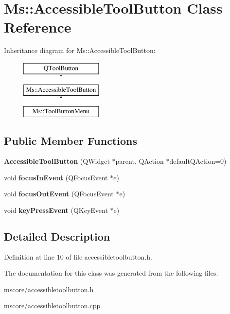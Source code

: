 \hypertarget{class_ms_1_1_accessible_tool_button}{}\section{Ms\+:\+:Accessible\+Tool\+Button Class Reference}
\label{class_ms_1_1_accessible_tool_button}
Inheritance diagram for Ms\+:\+:Accessible\+Tool\+Button\+:\begin{figure}[H]
\begin{center}
\leavevmode
\includegraphics[height=3.000000cm]{class_ms_1_1_accessible_tool_button}
\end{center}
\end{figure}
\subsection*{Public Member Functions}
\begin{DoxyCompactItemize}
\item 
\mbox{\label{class_ms_1_1_accessible_tool_button_ace1fb58a6badc5a3defe34ddb1afd970}} 
{\bfseries Accessible\+Tool\+Button} (Q\+Widget $\ast$parent, Q\+Action $\ast$default\+Q\+Action=0)
\item 
\mbox{\label{class_ms_1_1_accessible_tool_button_acd2b1c088299ee0a40c0dd819ffb1a96}} 
void {\bfseries focus\+In\+Event} (Q\+Focus\+Event $\ast$e)
\item 
\mbox{\label{class_ms_1_1_accessible_tool_button_abdcbc7c5510b2455eaa8ebe5b05ff159}} 
void {\bfseries focus\+Out\+Event} (Q\+Focus\+Event $\ast$e)
\item 
\mbox{\label{class_ms_1_1_accessible_tool_button_afd5d22b0184a32bd770e3180a68166b2}} 
void {\bfseries key\+Press\+Event} (Q\+Key\+Event $\ast$e)
\end{DoxyCompactItemize}


\subsection{Detailed Description}


Definition at line 10 of file accessibletoolbutton.\+h.



The documentation for this class was generated from the following files\+:\begin{DoxyCompactItemize}
\item 
mscore/accessibletoolbutton.\+h\item 
mscore/accessibletoolbutton.\+cpp\end{DoxyCompactItemize}
